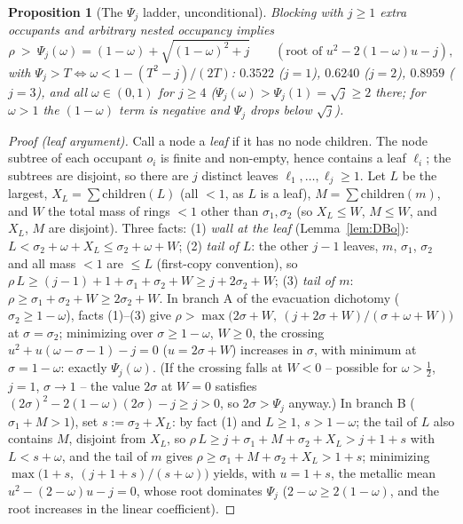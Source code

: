 \documentclass[11pt]{article}
\newtheorem{proposition}[theorem]{Proposition}
\theoremstyle{definition}
\begin{document}
\begin{proposition}[The $\Psi_j$ ladder, unconditional]\label{prop:DPsij}
Blocking with $j\ge1$ extra occupants and arbitrary nested occupancy
implies
\[
\rho\ >\ \Psi_j(\omega)=(1-\omega)+\sqrt{(1-\omega)^2+j}
\qquad(\text{root of }u^2-2(1-\omega)u-j),
\]
with $\Psi_j>T\iff\omega<1-(T^2-j)/(2T)$: $0.3522$ ($j=1$), $0.6240$
($j=2$), $0.8959$ ($j=3$), and all $\omega\in(0,1)$ for $j\ge4$
($\Psi_j(\omega)>\Psi_j(1)=\sqrt j\ge2$ there; for $\omega>1$ the
$(1-\omega)$ term is negative and $\Psi_j$ drops below $\sqrt j$).
\end{proposition}
\begin{proof}[Proof (leaf argument)]
Call a node a \emph{leaf} if it has no node children. The node subtree of
each occupant $o_i$ is finite and non-empty, hence contains a leaf
$\ell_i$; the subtrees are disjoint, so there are $j$ distinct leaves
$\ell_1,\dots,\ell_j\ge1$. Let $L$ be the largest,
$X_L=\sum\mathrm{children}(L)$ (all $<1$, as $L$ is a leaf),
$M=\sum\mathrm{children}(m)$, and $W$ the total mass of rings $<1$ other
than $\sigma_1,\sigma_2$ (so $X_L\le W$, $M\le W$, and $X_L$, $M$ are
disjoint). Three facts:
(1) \emph{wall at the leaf} (Lemma~\ref{lem:DBo}):
$L<\sigma_2+\omega+X_L\le\sigma_2+\omega+W$;
(2) \emph{tail of $L$}: the other $j-1$ leaves, $m$, $\sigma_1$,
$\sigma_2$ and all mass $<1$ are $\le L$ (first-copy convention), so
$\rho\,L\ge(j-1)+1+\sigma_1+\sigma_2+W\ge j+2\sigma_2+W$;
(3) \emph{tail of $m$}: $\rho\ge\sigma_1+\sigma_2+W\ge2\sigma_2+W$.
In branch A of the evacuation dichotomy ($\sigma_2\ge1-\omega$), facts
(1)--(3) give
$\rho>\max\bigl(2\sigma+W,\ (j+2\sigma+W)/(\sigma+\omega+W)\bigr)$ at
$\sigma=\sigma_2$; minimizing over $\sigma\ge1-\omega$, $W\ge0$, the
crossing $u^2+u(\omega-\sigma-1)-j=0$ ($u=2\sigma+W$) increases in
$\sigma$, with minimum at $\sigma=1-\omega$: exactly $\Psi_j(\omega)$.
(If the crossing falls at $W<0$ -- possible for $\omega>\tfrac12$, $j=1$,
$\sigma\to1$ -- the value $2\sigma$ at $W=0$ satisfies
$(2\sigma)^2-2(1-\omega)(2\sigma)-j\ge j>0$, so $2\sigma>\Psi_j$ anyway.)
In branch B ($\sigma_1+M>1$), set $s:=\sigma_2+X_L$: by fact (1) and
$L\ge1$, $s>1-\omega$; the tail of $L$ also contains $M$, disjoint from
$X_L$, so $\rho\,L\ge j+\sigma_1+M+\sigma_2+X_L>j+1+s$ with $L<s+\omega$,
and the tail of $m$ gives $\rho\ge\sigma_1+M+\sigma_2+X_L>1+s$;
minimizing $\max\bigl(1+s,\ (j+1+s)/(s+\omega)\bigr)$ yields, with
$u=1+s$, the metallic mean $u^2-(2-\omega)u-j=0$, whose root dominates
$\Psi_j$ ($2-\omega\ge2(1-\omega)$, and the root increases in the linear
coefficient).
\end{proof}
\end{document}
